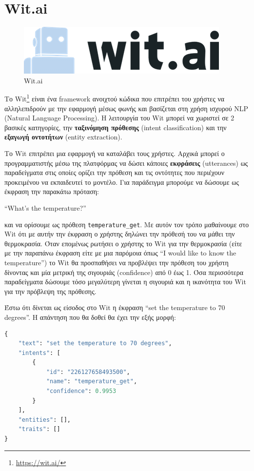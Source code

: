 \section{Wit.ai}
\label{sec:wit}

\begin{figure}[h]
    \centering
    \includegraphics[scale=0.6]{images/chapter3/wit_logo.png}
    \caption{Wit.ai}
\end{figure}
Το Wit\footnote{\href{https://wit.ai/}{https://wit.ai/}} είναι ένα framework ανοιχτού κώδικα που επιτρέπει του χρήστες να αλληλεπιδρούν με την εφαρμογή μέσως φωνής και βασίζεται στη χρήση ισχυρού NLP (Natural Language Processing). Η λειτουργία του Wit μπορεί να χωριστεί σε 2 βασικές κατηγορίες, την \textbf{ταξινόμηση πρόθεσης} (intent classification) και την \textbf{εξαγωγή οντοτήτων} (entity extraction).

Το Wit επιτρέπει μια εφαρμογή να καταλάβει τους χρήστες. Αρχικά μπορεί ο προγραμματιστής μέσω της πλατφόρμας να δώσει κάποιες \textbf{εκφράσεις} (utterances) ως παραδείγματα στις οποίες ορίζει την πρόθεση και τις οντότητες που περιέχουν προκειμένου να εκπαιδευτεί το μοντέλο. Για παράδειγμα μπορούμε να δώσουμε ως έκφραση την παρακάτω πρόταση:

\enquote{What's the temperature?}

\noindent και να ορίσουμε ως πρόθεση \texttt{temperature\_get}. Με αυτόν τον τρόπο μαθαίνουμε στο Wit ότι με αυτήν την έκφραση ο χρήστης δηλώνει την πρόθεσή του να μάθει την θερμοκρασία. Όταν επομένως ρωτήσει ο χρήστης το Wit για την θερμοκρασία (είτε με την παραπάνω έκφραση είτε με μια παρόμοια όπως \enquote{I would like to know the temperature}) το Wit θα προσπαθήσει να προβλέψει την πρόθεση του χρήστη δίνοντας και μία μετρική της σιγουριάς (confidence) από 0 έως 1. Όσα περισσότερα παραδείγματα δώσουμε τόσο μεγαλύτερη γίνεται η σιγουριά και η ικανότητα του Wit για την πρόβλεψη της πρόθεσης.

Έστω ότι δίνεται ως είσοδος στο Wit η έκφραση \enquote{set the temperature to 70 degrees}. Η απάντηση που θα δοθεί θα έχει την εξής μορφή:

\begin{lstlisting}[language=Python]
{
    "text": "set the temperature to 70 degrees",
    "intents": [
        {
            "id": "226127658493500",
            "name": "temperature_get",
            "confidence": 0.9953
        }
    ],
    "entities": [],
    "traits": []
}
\end{lstlisting}

